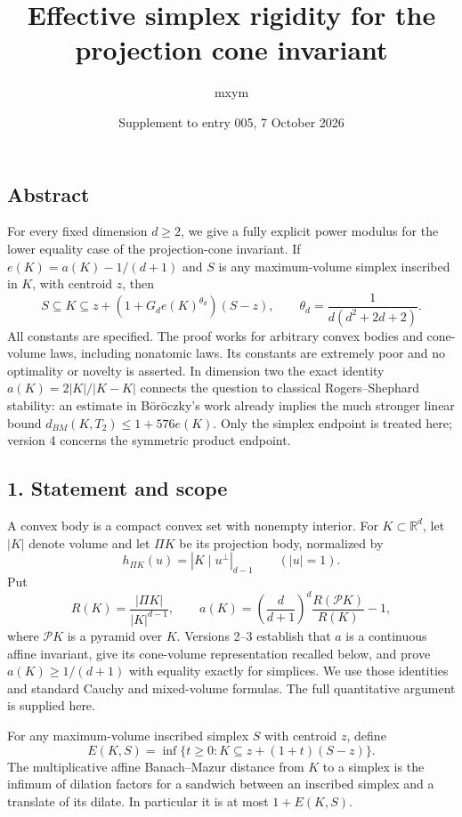 \documentclass[
  11pt,
]{article}
\title{Effective simplex rigidity for the projection cone invariant}
\author{mxym}
\date{Supplement to entry 005, 7 October 2026}
\begin{document}
\maketitle

\subsection{Abstract}\label{abstract}

For every fixed dimension \(d\ge2\), we give a fully explicit power
modulus for the lower equality case of the projection-cone invariant. If
\(e(K)=a(K)-1/(d+1)\) and \(S\) is any maximum-volume simplex inscribed
in \(K\), with centroid \(z\), then
\[S\subseteq K\subseteq z+(1+G_d e(K)^{\theta_d})(S-z),
\qquad \theta_d=\frac1{d(d^2+2d+2)}.\] All constants are specified. The
proof works for arbitrary convex bodies and cone-volume laws, including
nonatomic laws. Its constants are extremely poor and no optimality or
novelty is asserted. In dimension two the exact identity
\(a(K)=2|K|/|K-K|\) connects the question to classical Rogers--Shephard
stability: an estimate in Böröczky's work already implies the much
stronger linear bound \(d_{BM}(K,T_2)\le1+576e(K)\). Only the simplex
endpoint is treated here; version 4 concerns the symmetric product
endpoint.

\subsection{1. Statement and scope}\label{statement-and-scope}

A convex body is a compact convex set with nonempty interior. For
\(K\subset\mathbb R^d\), let \(|K|\) denote volume and let \(\Pi K\) be
its projection body, normalized by
\[h_{\Pi K}(u)=|K\mid u^\perp|_{d-1}\qquad (|u|=1).\] Put
\[R(K)=\frac{|\Pi K|}{|K|^{d-1}},\qquad
a(K)=\left(\frac d{d+1}\right)^d
\frac{R(\mathcal P K)}{R(K)}-1,\] where \(\mathcal P K\) is a pyramid
over \(K\). Versions 2--3 establish that \(a\) is a continuous affine
invariant, give its cone-volume representation recalled below, and prove
\(a(K)\ge1/(d+1)\) with equality exactly for simplices. We use those
identities and standard Cauchy and mixed-volume formulas. The full
quantitative argument is supplied here.

For any maximum-volume inscribed simplex \(S\) with centroid \(z\),
define \[E(K,S)=\inf\{t\ge0:K\subseteq z+(1+t)(S-z)\}.\] The
multiplicative affine Banach--Mazur distance from \(K\) to a simplex is
the infimum of dilation factors for a sandwich between an inscribed
simplex and a translate of its dilate. In particular it is at most
\(1+E(K,S)\).
\end{document}
